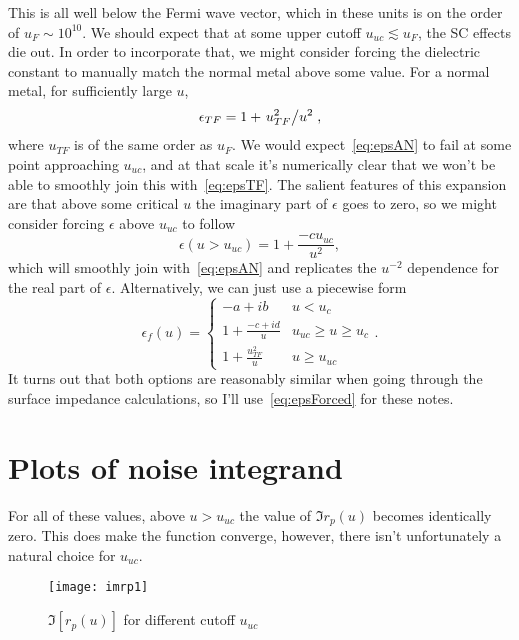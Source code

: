 \documentclass[11pt]{article}
\begin{document}
	This is all well below the Fermi wave vector, which in these units is on the order of $u_F \sim 10^{10}$.
	We should expect that at some upper cutoff $u_{uc} \lesssim u_F$, the SC effects die out.
	In order to incorporate that, we might consider forcing the dielectric constant to manually match the normal metal above some value.
	For a normal metal, for sufficiently large $u$,
	\begin{equation}
		\epsilon_{TF} = 1 + \flatfrac{u_{TF}^2}{u^2} \label{eq:epsTF},
	\end{equation}
	where $u_{TF}$ is of the same order as $u_F$.
	We would expect~\eqref{eq:epsAN} to fail at some point approaching $u_{uc}$, and at that scale it's numerically clear that we won't be able to smoothly join this with~\eqref{eq:epsTF}.
	The salient features of this expansion are that above some critical $u$ the imaginary part of $\epsilon$ goes to zero, so we might consider forcing $\epsilon$ above $u_{uc}$ to follow
	\begin{equation}
		\epsilon(u > u_{uc}) = 1 + \frac{-c u_{uc}}{u^2}, \label{eq:epsSmoothJoin}
	\end{equation}
	which will smoothly join with~\eqref{eq:epsAN} and replicates the $u^{-2}$ dependence for the real part of $\epsilon$.
	Alternatively, we can just use a piecewise form
	\begin{equation}
		\epsilon_f(u) =
		\begin{cases}
			-a + i b & u < u_c \\
			1 + \frac{-c + i d}{u} &  u_{uc} \geq u \geq u_c \\
			1 + \frac{u_{TF}^2}{u} &  u \geq u_{uc}
		\end{cases}. \label{eq:epsForced}
	\end{equation}
	It turns out that both options are reasonably similar when going through the surface impedance calculations, so I'll use~\eqref{eq:epsForced} for these notes.

	\section{Plots of noise integrand} \label{sec:plotsdiscussion}

	For all of these values, above $u > u_{uc}$ the value of $\Im r_p(u)$ becomes identically zero.
	This does make the function converge, however, there isn't unfortunately a natural choice for $u_{uc}$.
	\begin{figure}[htp]
		\centering
		\texttt{[image: imrp1]}
		\caption{$\Im[r_p(u)]$ for different cutoff $u_{uc}$} \label{fig:imrpVsCutoff}
	\end{figure}
\end{document}
